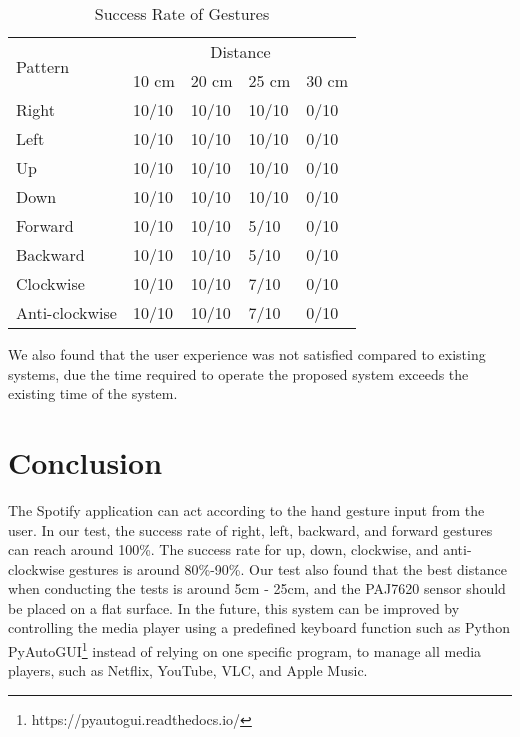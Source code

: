 \documentclass[conference,a4paper]{IEEEtran}
\begin{document}
\begin{table}[hbt!]
\centering
\caption{Success Rate of Gestures}
\begin{tabular}{lllll}
\toprule
\multirow{2}{*}{Pattern} & \multicolumn{4}{c}{Distance}                                                          \\ \cmidrule(r){2-5} 
                         & \multicolumn{1}{l}{10 cm}    & \multicolumn{1}{l}{20 cm}    & \multicolumn{1}{l}{25 cm}    & 30 cm\\   
\midrule
Right                    & \multicolumn{1}{l}{10/10} & \multicolumn{1}{l}{10/10} & \multicolumn{1}{l}{10/10} & 0/10 \\
Left                     & \multicolumn{1}{l}{10/10} & \multicolumn{1}{l}{10/10} & \multicolumn{1}{l}{10/10} & 0/10 \\
Up                       & \multicolumn{1}{l}{10/10} & \multicolumn{1}{l}{10/10} & \multicolumn{1}{l}{10/10} & 0/10 \\
Down                     & \multicolumn{1}{l}{10/10} & \multicolumn{1}{l}{10/10} & \multicolumn{1}{l}{10/10} & 0/10 \\
Forward                  & \multicolumn{1}{l}{10/10} & \multicolumn{1}{l}{10/10} & \multicolumn{1}{l}{5/10} & 0/10 \\
Backward                 & \multicolumn{1}{l}{10/10} & \multicolumn{1}{l}{10/10} & \multicolumn{1}{l}{5/10} & 0/10 \\
Clockwise                & \multicolumn{1}{l}{10/10} & \multicolumn{1}{l}{10/10} & \multicolumn{1}{l}{7/10} & 0/10 \\
Anti-clockwise           & \multicolumn{1}{l}{10/10} & \multicolumn{1}{l}{10/10} & \multicolumn{1}{l}{7/10} & 0/10 \\ 
\bottomrule
\end{tabular}
\label{table3}
\end{table}

We also found that the user experience was not satisfied compared to existing systems, due the time required to operate the proposed system exceeds the existing time of the system.

\section{Conclusion}
The Spotify application can act according to the hand gesture input from the user. In our test, the success rate of right, left, backward, and forward gestures can reach around 100\%. The success rate for up, down, clockwise, and anti-clockwise gestures is around 80\%-90\%. Our test also found that the best distance when conducting the tests is around 5cm - 25cm, and the PAJ7620 sensor should be placed on a flat surface. In the future, this system can be improved by controlling the media player using a predefined keyboard function such as Python PyAutoGUI\footnote{https://pyautogui.readthedocs.io/} instead of relying on one specific program,  to manage all media players, such as Netflix, YouTube, VLC, and Apple Music.
\end{document}
